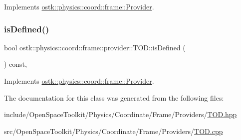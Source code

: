 Implements \hyperlink{classostk_1_1physics_1_1coord_1_1frame_1_1_provider_a38b86a589f46f8b8a9c97ab2776f37d1}{ostk\+::physics\+::coord\+::frame\+::\+Provider}.

\mbox{\label{classostk_1_1physics_1_1coord_1_1frame_1_1provider_1_1_t_o_d_a57f8d993ac693b2cd39b4a99faadc92f}} 
\subsubsection{\texorpdfstring{is\+Defined()}{isDefined()}}
{\footnotesize\ttfamily bool ostk\+::physics\+::coord\+::frame\+::provider\+::\+T\+O\+D\+::is\+Defined (\begin{DoxyParamCaption}{ }\end{DoxyParamCaption}) const\hspace{0.3cm}{\ttfamily [override]}, {\ttfamily [virtual]}}



Implements \hyperlink{classostk_1_1physics_1_1coord_1_1frame_1_1_provider_a27acab0012649796b97956fed1a91493}{ostk\+::physics\+::coord\+::frame\+::\+Provider}.



The documentation for this class was generated from the following files\+:\begin{DoxyCompactItemize}
\item 
include/\+Open\+Space\+Toolkit/\+Physics/\+Coordinate/\+Frame/\+Providers/\hyperlink{_t_o_d_8hpp}{T\+O\+D.\+hpp}\item 
src/\+Open\+Space\+Toolkit/\+Physics/\+Coordinate/\+Frame/\+Providers/\hyperlink{_t_o_d_8cpp}{T\+O\+D.\+cpp}\end{DoxyCompactItemize}
